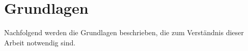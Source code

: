 \chapter{Grundlagen} \label{Grundlagen}
Nachfolgend werden die Grundlagen beschrieben, die zum Verständnis dieser Arbeit notwendig sind.
